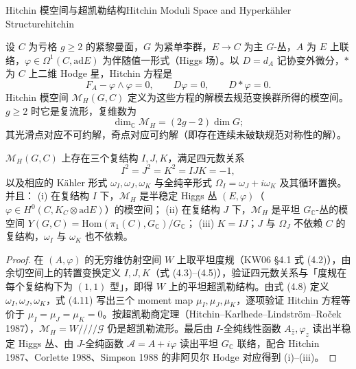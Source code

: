 \begin{centry}{Hitchin 模空间与超凯勒结构}{Hitchin Moduli Space and Hyperkähler Structure}{hitchin}

\begin{definition}
设 $C$ 为亏格 $g\ge2$ 的紧黎曼面，$G$ 为紧单李群，$E\to C$ 为主 $G$-丛，$A$ 为 $E$ 上联络，$\varphi\in\Omega^{1}(C,\mathrm{ad}E)$ 为伴随值一形式（Higgs 场）。以 $D=d_{A}$ 记协变外微分，$\ast$ 为 $C$ 上二维 Hodge 星，Hitchin 方程是
\[
F_{A}-\varphi\wedge\varphi=0,\qquad D\varphi=0,\qquad D\ast\varphi=0 .
\]
Hitchin 模空间 $\mathcal M_{H}(G,C)$ 定义为这些方程的解模去规范变换群所得的模空间。$g\ge2$ 时它是复流形，复维数为
\[
\dim_{\mathbb C}\mathcal M_{H}=(2g-2)\dim G ;
\]
其光滑点对应不可约解，奇点对应可约解（即存在连续未破缺规范对称性的解）。
\end{definition}

\begin{theorem}
$\mathcal M_{H}(G,C)$ 上存在三个复结构 $I,J,K$，满足四元数关系
\[
I^{2}=J^{2}=K^{2}=IJK=-1,
\]
以及相应的 Kähler 形式 $\omega_{I},\omega_{J},\omega_{K}$ 与全纯辛形式
$\Omega_{I}=\omega_{J}+i\omega_{K}$ 及其循环置换。并且：
(i) 在复结构 $I$ 下，$\mathcal M_{H}$ 是半稳定 Higgs 丛 $(E,\varphi)$（$\varphi\in H^{0}(C,K_{C}\otimes\mathrm{ad}E)$）的模空间；
(ii) 在复结构 $J$ 下，$\mathcal M_{H}$ 是平坦 $G_{\mathbb C}$-丛的模空间 $Y(G,C)=\mathrm{Hom}(\pi_{1}(C),G_{\mathbb C})/G_{\mathbb C}$；
(iii) $K=IJ$；$J$ 与 $\Omega_{J}$ 不依赖 $C$ 的复结构，$\omega_{I}$ 与 $\omega_{K}$ 也不依赖。
\end{theorem}
\begin{proof}
在 $(A,\varphi)$ 的无穷维仿射空间 $W$ 上取平坦度规（KW06 §4.1 式 (4.2)），由余切空间上的转置变换定义 $I,J,K$（式 (4.3)--(4.5)），验证四元数关系与「度规在每个复结构下为 $(1,1)$ 型」，即得 $W$ 上的平坦超凯勒结构。由式 (4.8) 定义 $\omega_{I},\omega_{J},\omega_{K}$，式 (4.11) 写出三个 moment map $\mu_{I},\mu_{J},\mu_{K}$，逐项验证 Hitchin 方程等价于 $\mu_{I}=\mu_{J}=\mu_{K}=0$。按超凯勒商定理（Hitchin--Karlhede--Lindstr\"om--Ro\v{c}ek 1987），$\mathcal M_{H}=W////\mathcal G$ 仍是超凯勒流形。最后由 $I$-全纯线性函数 $A_{\bar z},\varphi_{z}$ 读出半稳定 Higgs 丛、由 $J$-全纯函数 $\mathcal A=A+i\varphi$ 读出平坦 $G_{\mathbb C}$ 联络，配合 Hitchin 1987、Corlette 1988、Simpson 1988 的非阿贝尔 Hodge 对应得到 (i)--(iii)。
\end{proof}


\end{centry}
